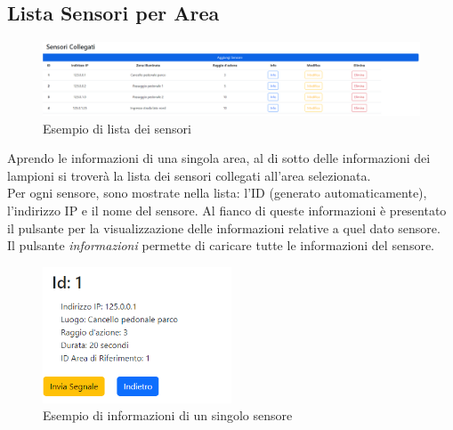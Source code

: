 \documentclass[a4paper, 12pt]{article}
\begin{document}
\subsection{Lista Sensori per Area}
\begin{figure}[H]
\centering
\includegraphics[width=\textwidth]{ListaSensori}
\caption{Esempio di lista dei sensori}
\end{figure}
Aprendo le informazioni di una singola area, al di sotto delle informazioni dei lampioni si troverà la lista dei sensori collegati all'area selezionata.\\
Per ogni sensore, sono mostrate nella lista: l'ID (generato automaticamente), l'indirizzo IP e il nome del sensore. Al fianco di queste informazioni è presentato il pulsante per la visualizzazione delle informazioni relative a quel dato sensore.\\
Il pulsante \textit{informazioni} permette di caricare tutte le informazioni del sensore.\\
\begin{figure}[H]
\centering
\includegraphics[width=0.5\textwidth]{InfoSensore}
\caption{Esempio di informazioni di un singolo sensore}
\end{figure}
\end{document}
